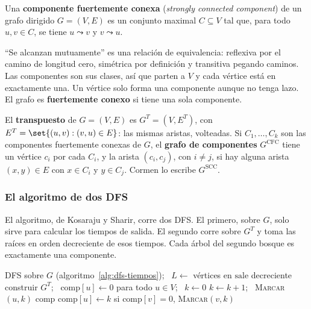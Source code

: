 \documentclass[11pt,letterpaper]{article}
\begin{document}
\begin{definicion}
  \label{def:componente-fuerte}
  Una \textbf{componente fuertemente conexa} (\textit{strongly
  connected component}) de un grafo dirigido $G = (V, E)$ es un
  conjunto maximal $C \subseteq V$ tal que, para todo $u, v \in C$, se
  tiene $u \leadsto v$ y $v \leadsto u$.
\end{definicion}

``Se alcanzan mutuamente'' es una relación de equivalencia: reflexiva
por el camino de longitud cero, simétrica por definición y transitiva
pegando caminos. Las componentes son sus clases, así que parten a $V$ y
cada vértice está en exactamente una. Un vértice solo forma una
componente aunque no tenga lazo. El grafo es \textbf{fuertemente
conexo} si tiene una sola componente.

\begin{definicion}
  \label{def:grafo-componentes}
  El \textbf{transpuesto} de $G = (V, E)$ es $G^T = (V, E^T)$, con
  $E^T = \set{(u, v) : (v, u) \in E}$: las mismas aristas, volteadas.
  Si $C_1, \dots, C_k$ son las componentes fuertemente conexas de $G$,
  el \textbf{grafo de componentes} $G^{\text{CFC}}$ tiene un vértice
  $c_i$ por cada $C_i$, y la arista $(c_i, c_j)$, con $i \neq j$, si
  hay alguna arista $(x, y) \in E$ con $x \in C_i$ y $y \in C_j$.
  Cormen lo escribe $G^{\text{SCC}}$.
\end{definicion}

\subsubsection*{El algoritmo de dos DFS}

El algoritmo, de Kosaraju y Sharir, corre dos DFS. El primero, sobre
$G$, solo sirve para calcular los tiempos de salida. El segundo corre
sobre $G^T$ y toma las raíces en orden decreciente de esos tiempos.
Cada árbol del segundo bosque es exactamente una componente.

\begin{algorithm}[H]
\caption{\textsc{Componentes-Fuertes}$(G)$, dos DFS (Kosaraju)}
\label{alg:componentes-fuertes}
\begin{algorithmic}[1]
  \State DFS sobre $G$ (algoritmo~\ref{alg:dfs-tiempos}); \ $L \gets$
         vértices en $\text{sale}$ decreciente
  \State construir $G^T$; \ $\text{comp}[u] \gets 0$ para todo
         $u \in V$; \ $k \gets 0$ 
   
      \State $k \gets k + 1$; \ \textsc{Marcar}$(u, k)$
    \EndIf
  \EndFor
  \State \Return $\text{comp}$
\EndProcedure
\Statex
{} 
  \State $\text{comp}[u] \gets k$
    \State si $\text{comp}[v] = 0$, \textsc{Marcar}$(v, k)$
  \EndFor
\EndProcedure
\end{algorithmic}
\end{algorithm}
\end{document}
